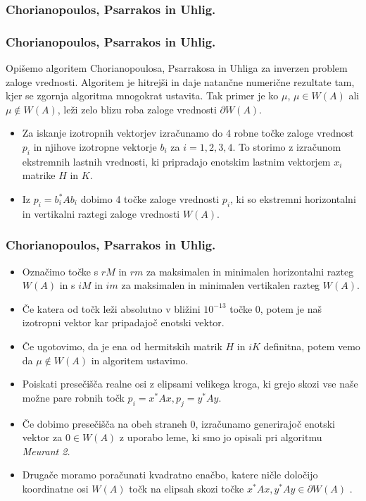 \documentclass{beamer}
\begin{document}
\subsubsection{Chorianopoulos, Psarrakos in Uhlig.}
\begin{frame}
\frametitle{Chorianopoulos, Psarrakos in Uhlig.}
Opišemo algoritem Chorianopoulosa, Psarrakosa in Uhliga za inverzen problem zaloge vrednosti. 
Algoritem je hitrejši in daje natančne numerične rezultate tam, kjer se zgornja algoritma mnogokrat ustavita. Tak primer je ko $\mu$, $\mu \in W(A)$ ali $\mu \not\in W(A)$, leži zelo blizu roba zaloge vrednosti $\partial W(A)$. \pause
\begin{itemize}
\item Za iskanje izotropnih vektorjev izračunamo do 4 robne točke zaloge vrednost $p_i$ in njihove izotropne vektorje $b_i$ za $i=1,2,3,4$. To storimo z izračunom ekstremnih lastnih vrednosti, ki pripradajo enotskim lastnim vektorjem $x_i$ %
matrike $H$ in $K$. 
\item Iz $p_i =b^\ast _i Ab_i$ dobimo 4 točke zaloge vrednosti $p_i$, ki so ekstremni horizontalni in vertikalni raztegi zaloge vrednosti $W(A)$. 
\end{itemize}
\end{frame}
\begin{frame}
\frametitle{Chorianopoulos, Psarrakos in Uhlig.}
\begin{itemize}
\item Označimo točke s $rM$ in $rm$ za maksimalen in minimalen horizontalni razteg $W(A)$ in s $iM$ in $im$ za maksimalen in minimalen vertikalen razteg $W(A)$. 
\item Če katera od točk leži absolutno v bližini $10^{-13}$  točke 0, potem je naš izotropni vektor kar pripadajoč enotski vektor. \item Če ugotovimo, da je ena od hermitskih matrik $H$ in $iK$ definitna, potem vemo da $\mu \not\in W(A)$ in algoritem ustavimo.
\item Poiskati presečišča realne osi z elipsami velikega kroga, ki grejo skozi vse naše možne pare robnih točk $p_i=x^\ast Ax, p_j=y^\ast  Ay$.
\item Če dobimo presečišča na obeh straneh 0, izračunamo generirajoč enotski vektor za $0\in W(A)$ z uporabo leme, ki smo jo opisali pri algoritmu \emph{Meurant 2.}
\item Drugače moramo poračunati kvadratno enačbo, katere ničle določijo koordinatne osi $W(A)$ točk na elipsah skozi točke $x^\ast Ax,y^\ast Ay\in \partial W(A)$ .%

\end{itemize}
\end{frame}
\end{document}
